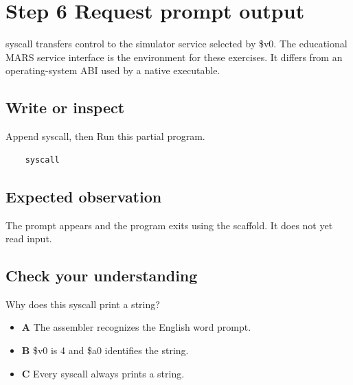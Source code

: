 \section{Step 6 Request prompt
  output}\label{001-console-calculation-s06-step-6-request-prompt-output}

syscall transfers control to the simulator service selected by \$v0. The
educational MARS service interface is the environment for these
exercises. It differs from an operating-system ABI used by a native
executable.

\subsection{Write or
  inspect}\label{001-console-calculation-s06-write-or-inspect}

Append syscall, then Run this partial program.

\begin{verbatim}
    syscall
\end{verbatim}

\subsection{Expected
  observation}\label{001-console-calculation-s06-expected-observation}

The prompt appears and the program exits using the scaffold. It does not
yet read input.

\subsection{Check your
  understanding}\label{001-console-calculation-s06-check-your-understanding}

Why does this syscall print a string?

\begin{itemize}
  \tightlist
  \item
        \textbf{A} The assembler recognizes the English word prompt.
  \item
        \textbf{B} \$v0 is 4 and \$a0 identifies the string.
  \item
        \textbf{C} Every syscall always prints a string.
\end{itemize}
